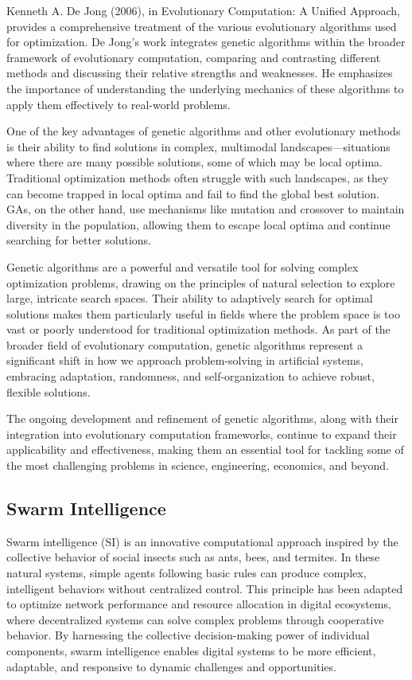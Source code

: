 \documentclass[12pt,twoside]{article}
\begin{document}
Kenneth A. De Jong (2006), in Evolutionary Computation: A Unified Approach, provides a comprehensive treatment of the various evolutionary algorithms used for optimization. De Jong’s work integrates genetic algorithms within the broader framework of evolutionary computation, comparing and contrasting different methods and discussing their relative strengths and weaknesses. He emphasizes the importance of understanding the underlying mechanics of these algorithms to apply them effectively to real-world problems.

One of the key advantages of genetic algorithms and other evolutionary methods is their ability to find solutions in complex, multimodal landscapes—situations where there are many possible solutions, some of which may be local optima. Traditional optimization methods often struggle with such landscapes, as they can become trapped in local optima and fail to find the global best solution. GAs, on the other hand, use mechanisms like mutation and crossover to maintain diversity in the population, allowing them to escape local optima and continue searching for better solutions.

Genetic algorithms are a powerful and versatile tool for solving complex optimization problems, drawing on the principles of natural selection to explore large, intricate search spaces. Their ability to adaptively search for optimal solutions makes them particularly useful in fields where the problem space is too vast or poorly understood for traditional optimization methods. As part of the broader field of evolutionary computation, genetic algorithms represent a significant shift in how we approach problem-solving in artificial systems, embracing adaptation, randomness, and self-organization to achieve robust, flexible solutions.

The ongoing development and refinement of genetic algorithms, along with their integration into evolutionary computation frameworks, continue to expand their applicability and effectiveness, making them an essential tool for tackling some of the most challenging problems in science, engineering, economics, and beyond.

\subsection{Swarm Intelligence}

Swarm intelligence (SI) is an innovative computational approach inspired by the collective behavior of social insects such as ants, bees, and termites. In these natural systems, simple agents following basic rules can produce complex, intelligent behaviors without centralized control. This principle has been adapted to optimize network performance and resource allocation in digital ecosystems, where decentralized systems can solve complex problems through cooperative behavior. By harnessing the collective decision-making power of individual components, swarm intelligence enables digital systems to be more efficient, adaptable, and responsive to dynamic challenges and opportunities.
\end{document}
